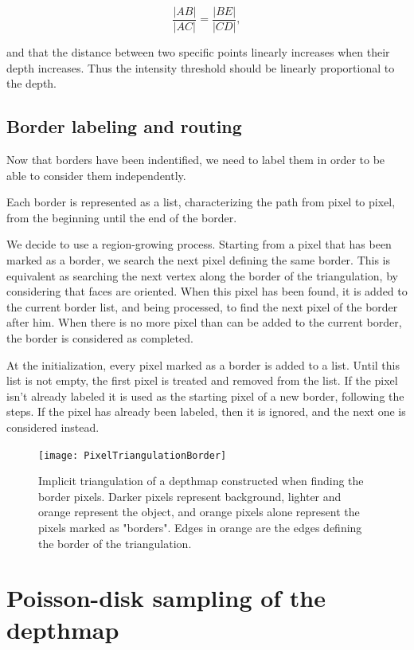 \documentclass[11pt,fleqn]{book} %
\begin{document}
\begin{equation}
	\frac{|AB|}{|AC|} = \frac{|BE|}{|CD|},
\end{equation}

and that the distance between two specific points linearly increases when their depth increases. Thus the intensity threshold should be linearly proportional to the depth.

\subsection{Border labeling and routing}
Now that borders have been indentified, we need to label them in order to be able to consider them independently. 

Each border is represented as a list, characterizing the path from pixel to pixel, from the beginning until the end of the border.

We decide to use a region-growing process. 
Starting from a pixel that has been marked as a border, we search the next pixel defining the same border. 
This is equivalent as searching the next vertex along the border of the triangulation, by considering that faces are oriented.
When this pixel has been found, it is added to the current border list, and being processed, to find the next pixel of the border after him.
When there is no more pixel than can be added to the current border, the border is considered as completed.

At the initialization, every pixel marked as a border is added to a list. Until this list is not empty, the first pixel is treated and removed from the list. 
If the pixel isn't already labeled it is used as the starting pixel of a new border, following the steps.
If the pixel has already been labeled, then it is ignored, and the next one is considered instead. 

\begin{figure}[ht]
\centering
\texttt{[image: PixelTriangulationBorder]}
\caption{Implicit triangulation of a depthmap constructed when finding the border pixels. Darker pixels represent background, lighter and orange represent the object, and orange pixels alone represent the pixels marked as "borders".
Edges in orange are the edges defining the border of the triangulation.}
\label{fig:border_triangulation}
\end{figure}

\section{Poisson-disk sampling of the depthmap}
\label{sec:poisson_sampling}
\end{document}
